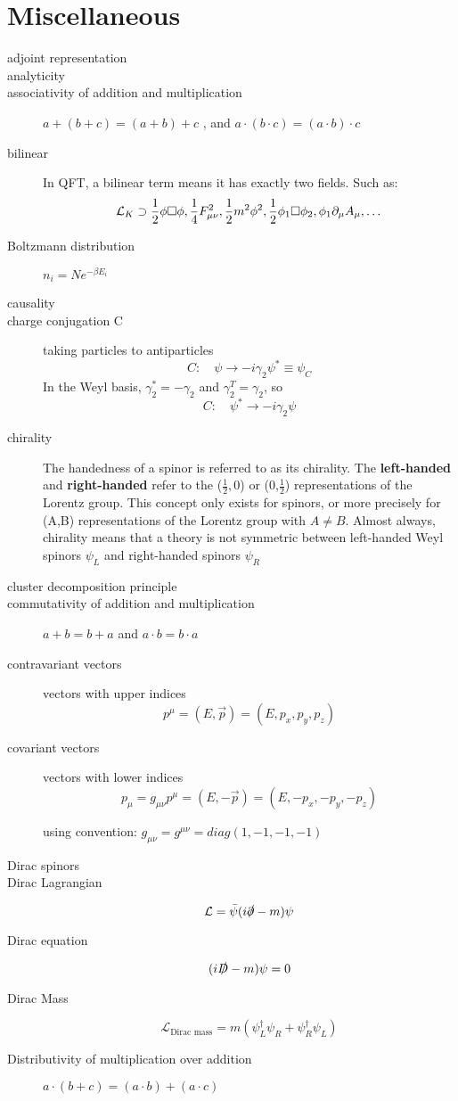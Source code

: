 \section{Miscellaneous}
\begin{description}
    \item [adjoint representation]
    \item [analyticity]
    \item [associativity of addition and multiplication]    
	$a+(b+c) = (a+b)+c$   , and $a\cdot(b\cdot c)=(a\cdot b)\cdot c$
    \item [bilinear]	In QFT, a bilinear term means it has exactly two
	fields. Such as:
	\[ \mathcal{L}_K \supset \frac{1}{2}\phi\Box\phi,
	\frac{1}{4}F^2_{\mu\nu}, \frac{1}{2}m^2\phi^2,
	\frac{1}{2}\phi_1\Box\phi_2, \phi_1\partial_\mu A_\mu, \dots \]

    \item [Boltzmann distribution]  $n_{i} = Ne^{-\beta E_{i}}$

    \item [causality]
    \item [charge conjugation C] taking particles to antiparticles
	\[  C:\quad\psi\rightarrow-i\gamma_2\psi^*\equiv\psi_C	\]
	In the Weyl basis, $\gamma_2^*=-\gamma_2$ and $\gamma_2^T=\gamma_2$, so
	\[  C:\quad\psi^*\rightarrow-i\gamma_2\psi  \]
    \item [chirality] The handedness of a spinor is referred to as its
	chirality. The \textbf{left-handed} and \textbf{right-handed} 
	refer to the ($\frac{1}{2},0$) or (0,$\frac{1}{2}$) representations
	of the Lorentz group. This concept only exists for spinors, or more
	precisely for (A,B) representations of the Lorentz group with
	$A\neq B$. Almost always, chirality means that a theory is not
	symmetric between left-handed Weyl spinors $\psi_L$ and right-handed
	spinors $\psi_R$
    \item [cluster decomposition principle]
    \item [commutativity of addition and multiplication] 
	$a+b=b+a$ and $a\cdot b = b\cdot a$
    \item [contravariant vectors]   vectors with upper indices
	$$ p^\mu = (E, \vec{p}) = (E, p_x, p_y, p_z) $$
    \item [covariant vectors]	vectors with lower indices
	$$ p_\mu = g_{\mu\nu}p^\mu = (E, -\vec{p}) = (E, -p_x, -p_y, -p_z) $$

	using convention: $g_{\mu\nu} = g^{\mu\nu} = diag(1, -1, -1, -1)$
    \item [Dirac spinors]
    \item [Dirac Lagrangian] 
	\[
	    \mathcal{L}=\bar{\psi}(i\slashed{\partial}-m)\psi
	\]
    \item [Dirac equation]
	\[  
	    (i\slashed{D} -m)\psi =0	
	\]
    \item [Dirac Mass]
	\[  
	    \mathcal{L}_{\text{Dirac mass}} = m(\psi_L^\dag\psi_R + \psi^\dag_R\psi_L) 
	\]
    \item [Distributivity of multiplication over addition]
	$a\cdot(b+c)=(a\cdot b) + (a\cdot c)$


\end{description}
